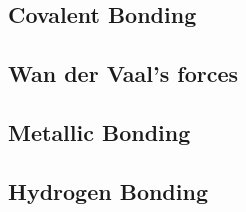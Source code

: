 \documentclass[11pt]{article}
\begin{document}
\subsection{Covalent Bonding}

\subsection{Wan der Vaal's forces}

\subsection{Metallic Bonding}

\subsection{Hydrogen Bonding}












% 
\end{document}
